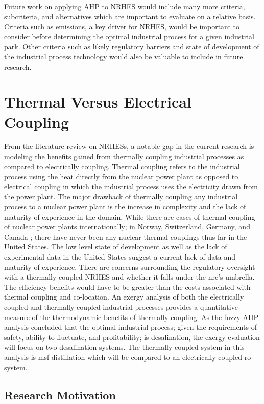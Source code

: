 \documentclass[12pt]{UIdahoMastersThesis}
\begin{document}
 Future work on applying AHP to NRHES would include many more criteria, subcriteria, and alternatives which are important to evaluate on a relative basis.  Criteria such as emissions, a key driver for NRHES, would be important to consider before determining the optimal industrial process for a given industrial park. Other criteria such as likely regulatory barriers and state of development of the industrial process technology would also be valuable to include in future research. 
 
\chapter{Thermal Versus Electrical Coupling}
\label{TvsE}
From the literature review on NRHESs, a notable gap in the current research is modeling the benefits gained from thermally coupling industrial processes as compared to electrically coupling. Thermal coupling refers to the industrial process using the heat directly from the nuclear power plant as opposed to electrical coupling in which the industrial process uses the electricity drawn from the power plant. The major drawback of thermally coupling any industrial process to a nuclear power plant is the increase in complexity and the lack of maturity of experience in the domain. While there are cases of thermal coupling of nuclear power plants internationally; in Norway, Switzerland, Germany, and Canada \cite{Verfondern};  there have never been any nuclear thermal couplings thus far in the United States.  The low level state of development as well as the lack of experimental data in the United States suggest a current lack of data and maturity of experience.  There are concerns surrounding the regulatory oversight with a thermally coupled NRHES and whether it falls under the \ac{nrc}'s umbrella. The efficiency benefits would have to be greater than the costs associated with thermal coupling and co-location.  An exergy analysis of both the electrically coupled and thermally coupled industrial processes provides a quantitative measure of the thermodynamic benefits of thermally coupling. As the fuzzy AHP analysis concluded that the optimal industrial process; given the requirements of safety, ability to fluctuate, and profitability; is desalination, the exergy evaluation will focus on two desalination systems.  The thermally coupled system in this analysis is \ac{msf} distillation which will be compared to an electrically coupled \ac{ro} system.

\section{Research Motivation}
\end{document}
